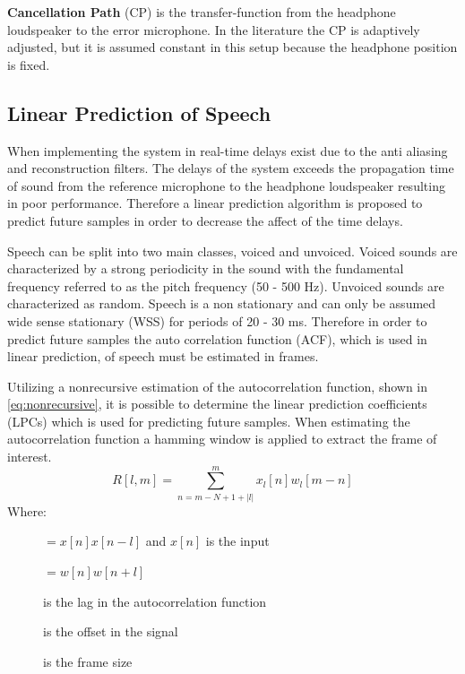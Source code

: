 \textbf{Cancellation Path} (CP) is the transfer-function from the headphone loudspeaker to the error microphone. In the literature \cite{Hansen} the CP is adaptively adjusted, but it is assumed constant in this setup because the headphone position is fixed.     

\subsection*{Linear Prediction of Speech}
When implementing the system in real-time delays exist due to the anti aliasing and reconstruction filters. The delays of the system exceeds the propagation time of sound from the reference microphone to the headphone loudspeaker resulting in poor performance. Therefore a linear prediction algorithm is proposed to predict future samples in order to decrease the affect of the time delays.


Speech can be split into two main classes, voiced and unvoiced. Voiced sounds are characterized by a strong periodicity in the sound with the fundamental frequency referred to as the pitch frequency (50 - 500 Hz). Unvoiced sounds are characterized as random. Speech is a non stationary and can only be assumed wide sense stationary (WSS) for periods of 20 - 30 ms. Therefore in order to predict future samples the auto correlation function (ACF), which is used in linear prediction, of speech must be estimated in frames. 

Utilizing a nonrecursive estimation of the autocorrelation function, shown in \autoref{eq:nonrecursive}, it is possible to determine the linear prediction coefficients (LPCs) which is used for predicting future samples. When estimating the autocorrelation function a hamming window is applied to extract the frame of interest.
\vspace{-4mm}
\begin{equation}\label{eq:nonrecursive}
R[l,m] = \sum^{m}_{n=m-N+1+\left| l\right|} x_l[n]w_l[m-n]
\end{equation}
Where:
\vspace{-8mm}
\begin{description}
	\item[] $=x[n]x[n-l]$ and $x[n]$ is the input
	\item[] $=w[n]w[n+l]$
	\item[] is the lag in the autocorrelation function
	\item[] is the offset in the signal
	\item[] is the frame size
\end{description}

